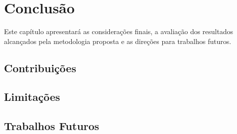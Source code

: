 \chapter{Conclusão}

Este capítulo apresentará as considerações finais, a avaliação dos resultados alcançados pela metodologia proposta e as direções para trabalhos futuros.

\section{Contribuições}

\section{Limitações}

\section{Trabalhos Futuros}